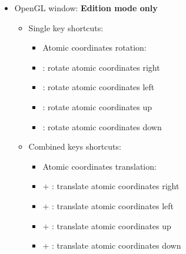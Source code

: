 {\begin{itemize}
\begin{itemize}
\begin{itemize}
\item Camera motion: \\
\item[] \Ctrl + \RArrow : move camera right
\item[] \Ctrl + \LArrow : move camera left
\item[] \Ctrl + \UArrow : move camera up
\item[] \Ctrl + \DArrow : move camera down \\
\item Spinning: \\
\item[] \Ctrl + \Shift + \RArrow : spin right / increase speed r. or reduce speed left
\item[] \Ctrl + \Shift + \RArrow : spin left / increase speed left or reduce speed right
\item[] \Ctrl + \Shift + \UArrow : spin up / increase speed up or reduce speed down
\item[] \Ctrl + \Shift + \DArrow : spin down / increase speed d. or reduce speed up \\
\item[] \Ctrl +  : stop spinning \\
\end{itemize}
\end{itemize}
\item OpenGL window: {\bf{Edition mode only}}
\begin{itemize}
\item Single key shortcuts: \\
\begin{itemize}
\item Atomic coordinates rotation: \\
\item[] \RArrow : rotate atomic coordinates right
\item[] \LArrow : rotate atomic coordinates left
\item[] \UArrow : rotate atomic coordinates up
\item[] \DArrow : rotate atomic coordinates down \\
\end{itemize}
\item Combined keys shortcuts: \\
\begin{itemize}
\item Atomic coordinates translation: \\
\item[] \Ctrl + \RArrow : translate atomic coordinates right
\item[] \Ctrl + \LArrow : translate atomic coordinates left
\item[] \Ctrl + \UArrow : translate atomic coordinates up
\item[] \Ctrl + \DArrow : translate atomic coordinates down
\end{itemize}
\end{itemize}
\end{itemize}}
